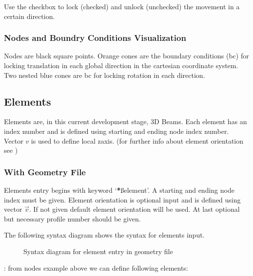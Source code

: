 \documentclass[letterpaper,10pt,english]{sphinxmanual}
\begin{document}
Use the checkbox to lock (checked) and
unlock (unchecked) the movement in a certain direction.

\noindent{}


\subsubsection{Nodes and Boundry Conditions Visualization}
\label{\detokenize{making_a_model:nodes-and-boundry-conditions-visualization}}
Nodes are black square points. Orange cones are the boundary conditions (bc) for locking translation in each global direction
in the cartesian coordinate system. Two nested blue cones are bc for locking rotation in each direction.

\noindent{}


\subsection{Elements}
\label{\detokenize{making_a_model:elements}}
Elements are, in this current development stage, 3D Beams. Each element has an index number and is defined using starting
and ending node index number. Vector \(v\) is used to define local z\sphinxhyphen{}axis. (for further info about element
orientation see {\hyperref[\detokenize{theory::doc}]{}})


\subsubsection{With Geometry File}
\label{\detokenize{making_a_model:id3}}
Elements entry begins with keyword ‘{\color{red}\bfseries{}*}ßelement’. A starting and ending node index must be given.
Element orientation is optional input and is defined using vector \(\vec{v}\).
If not given default element orientation will be used.
At last optional but necessary profile number should be given.

The following syntax diagram shows the syntax for elements input.

\begin{figure}[htbp]
\centering
\capstart

\noindent{}
\caption{Syntax diagram for element entry in geometry file}\label{\detokenize{making_a_model:id23}}\end{figure}

:
from nodes example above we can define following elements:
\end{document}

